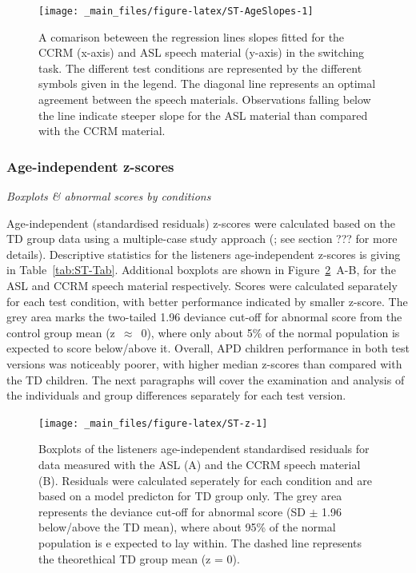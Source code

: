 \documentclass[a4paper, twoside]{templates/ociamthesis}
\begin{document}
\begin{figure}

{\centering \texttt{[image: \_main\_files/figure-latex/ST-AgeSlopes-1]} 

}

\caption{A comarison beteween the regression lines slopes fitted for the CCRM (x-axis) and ASL speech material (y-axis) in the switching task. The different test conditions are represented by the different symbols given in the legend. The diagonal line represents an optimal agreement between the speech materials. Observations falling below the line indicate steeper slope for the ASL material than compared with the CCRM material.}\label{fig:ST-AgeSlopes}
\end{figure}

\hypertarget{age-independent-z-scores}{%
\subsubsection*{Age-independent z-scores}\label{age-independent-z-scores}}

\colorbox[HTML]{CCCCFF}{\emph{Boxplots \& abnormal scores by conditions}}

Age-independent (standardised residuals) z-scores were calculated based on the TD group data using a multiple-case study approach (\textcite{Ramus2003}; see section ??? for more details). Descriptive statistics for the listeners age-independent z-scores is giving in Table~\ref{tab:ST-Tab}. Additional boxplots are shown in Figure~\ref{fig:ST-z}~A-B, for the ASL and CCRM speech material respectively. Scores were calculated separately for each test condition, with better performance indicated by smaller z-score. The grey area marks the two-tailed 1.96 deviance cut-off for abnormal score from the control group mean (z~\(\approx\)~0), where only about 5\% of the normal population is expected to score below/above it. Overall, APD children performance in both test versions was noticeably poorer, with higher median z-scores than compared with the TD children. The next paragraphs will cover the examination and analysis of the individuals and group differences separately for each test version.

\begin{figure}

{\centering \texttt{[image: \_main\_files/figure-latex/ST-z-1]} 

}

\caption{Boxplots of the listeners age-independent standardised residuals for data measured with the ASL (A) and the CCRM speech material (B). Residuals were calculated seperately for each condition and are based on a model predicton for TD group only. The grey area represents the deviance cut-off for abnormal score (SD $\pm$ 1.96 below/above the TD mean), where about 95\% of the normal population is e expected to lay within. The dashed line represents the theorethical TD group mean (z = 0).}\label{fig:ST-z}
\end{figure}
\end{document}
